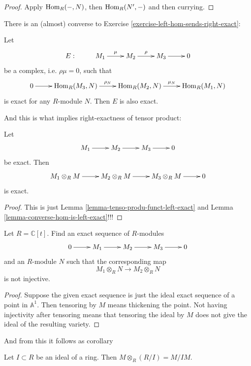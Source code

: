 \begin{proof}
Apply $\mathop{\mathrm{Hom}}\nolimits_R(-,N)$,
then $\mathop{\mathrm{Hom}}\nolimits_R(N',-)$
and then currying.
\end{proof}

\noindent
There is an (almost) converse
to Exercise
\ref{exercise-left-hom-sends-right-exact}:

\begin{lemma}
\label{lemma-converse-hom-is-left-exact}
Let
$$
\xymatrix{
E:&
M_1\ar[r]^\mu
&M_2\ar[r]^\rho
&M_3\ar[r]
&0
}
$$
be a complex,
i.e. $\rho\mu=0$,
such that
$$
\xymatrix{
0\ar[r]
&\Hom_R(M_3,N)\ar[r]^{\rho_N}
&\Hom_R(M_2,N)\ar[r]^{\mu_N}
&\Hom_R(M_1,N)
}
$$
is exact for any $R$-module $N$. Then $E$ is
also exact.
\end{lemma}

\noindent
And this is what implies right-exactness of
tensor product:

\begin{theorem}
\label{theorem-tensor-product-is-right-exact}
Let
$$
\xymatrix{
M_1\ar[r]
&M_2\ar[r]
&M_3\ar[r]
&0
}
$$
be exact. Then
$$
\xymatrix{
M_1 \otimes_R M\ar[r]
&M_2 \otimes_R M\ar[r]
&M_3 \otimes_R M\ar[r]
&0
}
$$
is exact.
\end{theorem}

\begin{proof}
This is just Lemma
\ref{lemma-tenso-produ-funct-left-exact}
and Lemma
\ref{lemma-converse-hom-is-left-exact}!!!
\end{proof}

\begin{exercise}
\label{exercise-not-flat}
Let $R=\mathbb{C}[t]$.
Find an exact sequence of $R$-modules
$$
\xymatrix{
0\ar[r]
&M_1\ar[r]
&M_2\ar[r]
&M_3\ar[r]
&0
}
$$
and an $R$-module $N$
such that the corresponding map
$$
M_1 \otimes_R N \to M_2 \otimes_R N
$$
is not injective.
\end{exercise}

\begin{proof}
Suppose the given exact sequence is just the
ideal
exact sequence of a point in $\mathbb{A}^1$.
Then tensoring by $M$ means thickening the
point.
Not having injectivity after tensoring
means that tensoring the ideal by $M$
does not give the ideal of the resulting
variety.
\end{proof}

And from this it follows as corollary

\begin{corollary}
\label{proposition-tensor-ideals}
Let $I \subset R$ be an ideal of a ring.
Then $M \otimes_R (R/I)=M/IM$.
\end{corollary}

